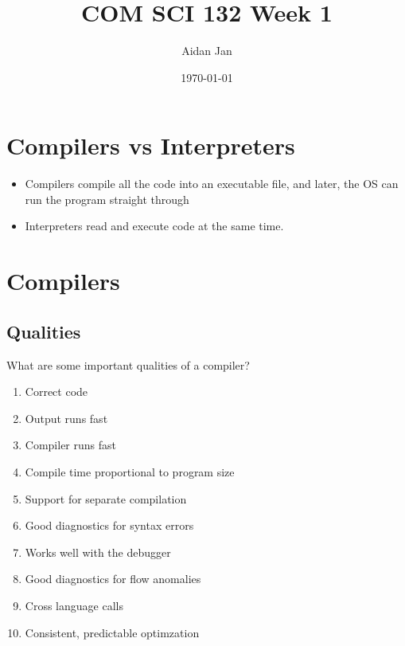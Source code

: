 \documentclass[10pt]{article}
\title{COM SCI 132 Week 1}
\author{Aidan Jan}
\date{\today}
\begin{document}
\maketitle
\section*{Compilers vs Interpreters}
\begin{itemize}
    \item Compilers compile all the code into an executable file, and later, the OS can run the program straight through
    \item Interpreters read and execute code at the same time.
\end{itemize}
\section*{Compilers}
\subsection*{Qualities}
What are some important qualities of a compiler?
\begin{enumerate}
    \item Correct code
    \item Output runs fast
    \item Compiler runs fast
    \item Compile time proportional to program size
    \item Support for separate compilation
    \item Good diagnostics for syntax errors
    \item Works well with the debugger
    \item Good diagnostics for flow anomalies
    \item Cross language calls
    \item Consistent, predictable optimzation
\end{enumerate}
\end{document}
